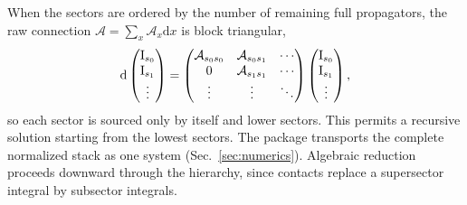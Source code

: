 \documentclass[11pt,a4paper]{article}
\numberwithin{table}{section}
\newcommand{\nd}{\mathrm{d}}
\begin{document}
When the sectors are ordered by the number of remaining full propagators, the raw connection
$\mathcal A=\sum_x\mathcal A_x\nd x$ is block triangular,
\begin{equation}
  \nd
  \begin{pmatrix}\bm{\text I}_{s_0}\\\bm{\text I}_{s_1}\\\vdots\end{pmatrix}
  =
  \begin{pmatrix}\mathcal A_{s_0s_0}&\mathcal A_{s_0s_1}&\cdots\\
  0&\mathcal A_{s_1s_1}&\cdots\\ \vdots&\vdots&\ddots\end{pmatrix}
  \begin{pmatrix}\bm{\text I}_{s_0}\\\bm{\text I}_{s_1}\\\vdots\end{pmatrix},
  \label{eq:block-triangular-de}
\end{equation}
so each sector is sourced only by itself and lower sectors. This permits a recursive solution
starting from the lowest sectors. The package transports the complete normalized stack as one
system (Sec.~\ref{sec:numerics}). Algebraic reduction proceeds downward through the hierarchy,
since contacts replace a supersector integral by subsector integrals.
\end{document}
